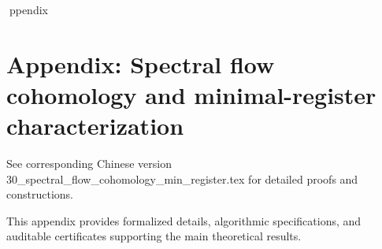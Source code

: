 ppendix

\section*{Appendix: Spectral flow cohomology and minimal-register characterization}

See corresponding Chinese version 30_spectral_flow_cohomology_min_register.tex for detailed proofs and constructions.

This appendix provides formalized details, algorithmic specifications, and auditable certificates supporting the main theoretical results.
